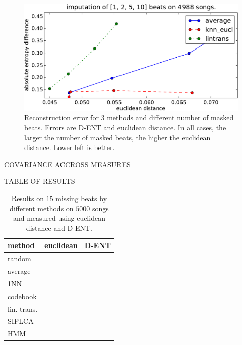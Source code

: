 \documentclass{article}
\begin{document}
\begin{figure}[t]
\begin{center}
\includegraphics[width=.9\columnwidth]{recon_score_in_2d_5k}
\end{center}
\caption{Reconstruction error for $3$ methods and different
number of masked beats. Errors are D-ENT and euclidean
distance. In all cases, the larger the number of masked beats,
the higher the euclidean distance. Lower left is better.
\label{fig:2dscore}}
\end{figure}


COVARIANCE ACCROSS MEASURES


TABLE OF RESULTS

\begin{table}[t]
\begin{small}
\begin{center}
\begin{tabular}{|l|c|c|} \hline
method & euclidean & D-ENT \\ \hline
random & & \\
average & & \\ \hline
1NN & & \\
codebook & & \\ \hline
lin. trans. & & \\
SIPLCA & & \\
HMM & & \\ \hline
\end{tabular}
\caption{Results on $15$ missing beats by different methods
on $5000$ songs and measured using euclidean distance and
D-ENT.
\label{tab:res}}
\end{center}
\end{small}
\end{table}
\end{document}
